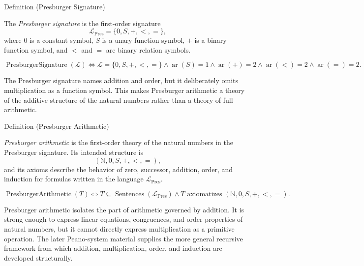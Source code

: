 \begin{definitionbox}{Definition (Presburger Signature)}
\begin{definition}
\label{def:presburger-signature}
The \emph{Presburger signature} is the first-order signature
\[
\mathcal{L}_{\mathrm{Pres}} = \{0, S, +, <, =\},
\]
where $0$ is a constant symbol, $S$ is a unary function symbol, $+$ is a
binary function symbol, and $<$ and $=$ are binary relation symbols.
\end{definition}

\begin{remark*}
\[
\operatorname{PresburgerSignature}(\mathcal{L})
\Longleftrightarrow
\mathcal{L} = \{0,S,+,<,=\}
\land \operatorname{ar}(S)=1
\land \operatorname{ar}(+)=2
\land \operatorname{ar}(<)=2
\land \operatorname{ar}(=)=2.
\]
\end{remark*}

\begin{remark*}[Interpretation]
The Presburger signature names addition and order, but it deliberately omits
multiplication as a function symbol. This makes Presburger arithmetic a theory
of the additive structure of the natural numbers rather than a theory of full
arithmetic.
\end{remark*}

\NoLocalDependencies
\end{definitionbox}

\begin{definitionbox}{Definition (Presburger Arithmetic)}
\begin{definition}
\label{def:presburger-arithmetic}
\emph{Presburger arithmetic} is the first-order theory of the natural numbers
in the Presburger signature. Its intended structure is
\[
(\mathbb{N},0,S,+,<,=),
\]
and its axioms describe the behavior of zero, successor, addition, order, and
induction for formulas written in the language
$\mathcal{L}_{\mathrm{Pres}}$.
\end{definition}

\begin{remark*}
\[
\operatorname{PresburgerArithmetic}(T)
\Longleftrightarrow
T \subseteq \operatorname{Sentences}(\mathcal{L}_{\mathrm{Pres}})
\land T \text{ axiomatizes } (\mathbb{N},0,S,+,<,=).
\]
\end{remark*}

\begin{remark*}[Interpretation]
Presburger arithmetic isolates the part of arithmetic governed by addition.
It is strong enough to express linear equations, congruences, and order
properties of natural numbers, but it cannot directly express multiplication
as a primitive operation. The later Peano-system material supplies the more
general recursive framework from which addition, multiplication, order, and
induction are developed structurally.
\end{remark*}

\NoLocalDependencies
\end{definitionbox}

